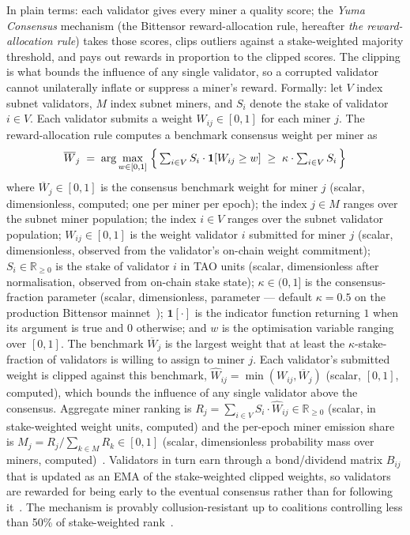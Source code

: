 \documentclass[11pt,a4paper]{article}
\begin{document}
In plain terms: each validator gives every miner a quality score; the
\emph{Yuma Consensus} mechanism (the Bittensor reward-allocation rule, hereafter
\emph{the reward-allocation rule}) takes those scores, clips outliers against a
stake-weighted majority threshold, and pays out rewards in proportion to the
clipped scores. The clipping is what bounds the influence of any single validator,
so a corrupted validator cannot unilaterally inflate or suppress a miner's
reward. Formally: let $V$ index subnet validators, $M$ index subnet miners,
and $S_i$ denote the stake of validator $i \in V$. Each validator submits a
weight $W_{ij} \in [0,1]$ for each miner $j$. The reward-allocation rule
computes a benchmark consensus weight per miner as
\begin{equation}
  \overline{W}_j \;=\; \arg\max_{w \in [0,1]} \;
    \Bigl\{\, \textstyle \sum_{i \in V} S_i \cdot \mathbf{1}\!\left[W_{ij} \ge w\right]
    \;\ge\; \kappa \cdot \textstyle \sum_{i \in V} S_i \,\Bigr\}
  \label{eq:yuma-consensus}
\end{equation}
where $\overline{W}_j \in [0, 1]$ is the consensus benchmark weight for miner $j$
(scalar, dimensionless, computed; one per miner per epoch); the index $j \in M$
ranges over the subnet miner population; the index $i \in V$ ranges over the
subnet validator population; $W_{ij} \in [0, 1]$ is the weight validator $i$
submitted for miner $j$ (scalar, dimensionless, observed from the validator's
on-chain weight commitment); $S_i \in \mathbb{R}_{\ge 0}$ is the stake of
validator $i$ in TAO units (scalar, dimensionless after normalisation, observed
from on-chain stake state); $\kappa \in (0, 1]$ is the consensus-fraction
parameter (scalar, dimensionless, parameter --- default $\kappa = 0.5$ on the
production Bittensor mainnet~\cite{opentensor2024yuma}); $\mathbf{1}[\cdot]$
is the indicator function returning $1$ when its argument is true and $0$
otherwise; and $w$ is the optimisation variable ranging over $[0, 1]$. The
benchmark $\overline{W}_j$ is the largest weight that at least the
$\kappa$-stake-fraction of validators is willing to assign to miner $j$. Each
validator's submitted weight is clipped against this benchmark,
$\widehat{W}_{ij} = \min(W_{ij}, \overline{W}_j)$ (scalar, $[0,1]$, computed),
which bounds the influence of any single validator above the consensus.
Aggregate miner ranking is
$R_j = \sum_{i \in V} S_i \cdot \widehat{W}_{ij} \in \mathbb{R}_{\ge 0}$ (scalar,
in stake-weighted weight units, computed) and the per-epoch miner emission share
is $M_j = R_j / \sum_{k \in M} R_k \in [0, 1]$ (scalar, dimensionless probability
mass over miners, computed)~\cite{opentensor2024yuma}. Validators in turn earn
through a bond/dividend matrix $B_{ij}$ that is updated as an EMA of the
stake-weighted clipped weights, so validators are rewarded for being early to the
eventual consensus rather than for following it~\cite{opentensor2024yuma,
steeves2022incentivizing}. The mechanism is provably collusion-resistant up to
coalitions controlling less than 50\% of stake-weighted
rank~\cite{steeves2022incentivizing}.
\end{document}
